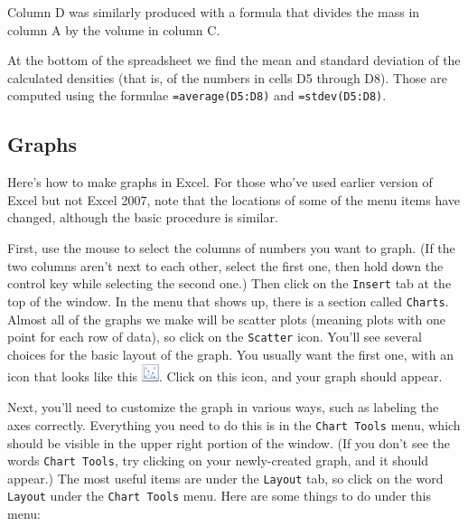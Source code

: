 Column D was similarly produced with a formula that divides the
mass in column A by the volume in column C.

At the bottom of the spreadsheet we find the mean and standard
deviation of the calculated densities (that is, of the numbers
in cells D5 through D8).  Those are computed
using the formulae {\tt =average(D5:D8)} and {\tt =stdev(D5:D8)}.




\subsection{Graphs}

Here's how to make graphs in Excel.  For those who've used 
earlier version of Excel but not Excel 2007, note that
the locations of some of the menu items have changed, although
the basic procedure is similar.

First, use the mouse
to select the columns of numbers you want to graph.  (If the two
columns aren't next to each other, select the first one, then hold
down the control key while selecting the second one.)
Then click on the {\tt Insert} tab at the top of the window.
In the menu that shows up, there is a section called {\tt Charts}.
Almost all of the graphs we make will be scatter plots (meaning plots
with one point for each row of data), so
click on the {\tt Scatter} icon.
You'll see several choices for the basic layout of the graph.  You
usually want the first one, with an icon that looks like this 
\includegraphics[width=0.2in]{appendices/excelfigs/scatterplot.eps}.  
Click on this icon, and your graph should appear.

Next, you'll need to customize the graph in various ways, such
as labeling the axes correctly.  Everything you need to do this
is in the {\tt Chart Tools} menu, which should
be visible in the upper right portion of the window.  (If you
don't see the words {\tt Chart Tools}, try clicking on your newly-created
graph, and it should appear.)  The most useful items are under
the {\tt Layout} tab, so click on the word {\tt Layout} under the {\tt Chart
Tools} menu.  Here are some things to do under this menu:

